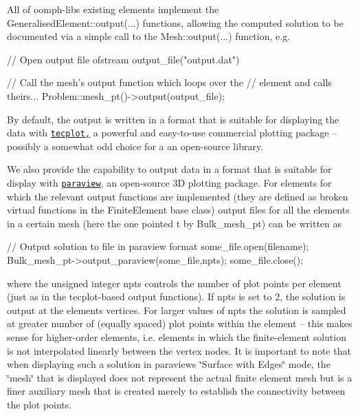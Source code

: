 All of {\ttfamily oomph-\/lib\textquotesingle{}s} existing elements implement the {\ttfamily Generalised\+Element\+::output}(...) functions, allowing the computed solution to be documented via a simple call to the {\ttfamily Mesh\+::output}(...) function, e.\+g.


\begin{DoxyCode}
\textcolor{comment}{// Open output file}
ofstream output\_file(\textcolor{stringliteral}{"output.dat"})

\textcolor{comment}{// Call the mesh's output function which loops over the }
\textcolor{comment}{// element and calls theirs...}
Problem::mesh\_pt()->output(output\_file);
\end{DoxyCode}


By default, the output is written in a format that is suitable for displaying the data with \href{http://www.tecplot.com}{\tt tecplot,} a powerful and easy-\/to-\/use commercial plotting package -- possibly a somewhat odd choice for a an open-\/source library.

We also provide the capability to output data in a format that is suitable for display with \href{http://www.paraview.org}{\tt paraview}, an open-\/source 3D plotting package. For elements for which the relevant output functions are implemented (they are defined as broken virtual functions in the {\ttfamily Finite\+Element} base class) output files for all the elements in a certain mesh (here the one pointed t by {\ttfamily Bulk\+\_\+mesh\+\_\+pt}) can be written as

 
\begin{DoxyCodeInclude}
 \textcolor{comment}{// Output solution to file in paraview format}
 some\_file.open(filename);
 Bulk\_mesh\_pt->output\_paraview(some\_file,npts);
 some\_file.close();

\end{DoxyCodeInclude}


where the unsigned integer {\ttfamily npts} controls the number of plot points per element (just as in the tecplot-\/based output functions). If {\ttfamily npts} is set to 2, the solution is output at the elements\textquotesingle{} vertices. For larger values of {\ttfamily npts} the solution is sampled at greater number of (equally spaced) plot points within the element -- this makes sense for higher-\/order elements, i.\+e. elements in which the finite-\/element solution is not interpolated linearly between the vertex nodes. It is important to note that when displaying such a solution in paraview\textquotesingle{}s \char`\"{}\+Surface with Edges\char`\"{} mode, the \char`\"{}mesh\char`\"{} that is displayed does not represent the actual finite element mesh but is a finer auxiliary mesh that is created merely to establish the connectivity between the plot points.


